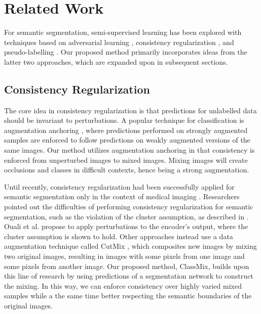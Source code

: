 \documentclass[10pt,twocolumn,letterpaper]{article}
\begin{document}
\section{Related Work}



For semantic segmentation, semi-supervised learning has been explored with techniques based on adversarial learning \cite{Hung,Mittal,qi2019ke}, consistency regularization \cite{French,StructuredLoss,medicalseg1,WeightAveragedConsistency}, and pseudo-labelling \cite{Feng,chen2020leveraging}. Our proposed method primarily incorporates ideas from the latter two approaches, which are expanded upon in subsequent sections.





\subsection{Consistency Regularization}
The core idea in consistency regularization is that predictions for unlabelled data should be invariant to perturbations. A popular technique for classification is augmentation anchoring \cite{xie2019unsupervised,FixMatch,ReMixMatch}, where predictions performed on strongly augmented samples are enforced to follow predictions on weakly augmented versions of the same images. Our method utilizes augmentation anchoring in that consistency is enforced from unperturbed images to mixed images. Mixing images will create occlusions and classes in difficult contexts, hence being a strong augmentation.

Until recently, consistency regularization had been successfully applied for semantic segmentation only in the context of medical imaging \cite{medicalseg1,WeightAveragedConsistency}. Researchers pointed out the difficulties of performing consistency regularization for semantic segmentation, such as the violation of the cluster assumption, as described in \cite{French,ouali2020semisupervised}. Ouali et al. \cite{ouali2020semisupervised} propose to apply perturbations to the encoder's output, where the cluster assumption is shown to hold. Other approaches \cite{French,StructuredLoss} instead use a data augmentation technique called CutMix \cite{CutMix}, which composites new images by mixing two original images, resulting in images with some pixels from one image and some pixels from another image. Our proposed method, ClassMix, builds upon this line of research by using predictions of a segmentation network to construct the mixing. In this way, we can enforce consistency over highly varied mixed samples while a the same time better respecting the semantic boundaries of the original images.
\end{document}
